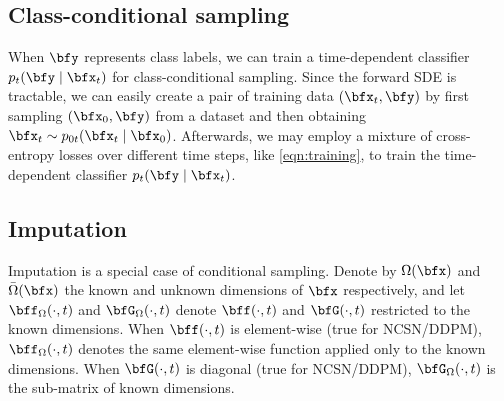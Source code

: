 \subsection{Class-conditional sampling}
When $\bfy$ represents class labels, we can train a time-dependent classifier $p_t(\bfy \mid \bfx_t)$ for class-conditional sampling. Since the forward SDE is tractable, we can easily create a pair of training data $(\bfx_t, \bfy)$ by first sampling $(\bfx_0, \bfy)$ from a dataset and then obtaining $\bfx_t \sim p_{0t}(\bfx_t \mid \bfx_0)$. Afterwards, we may employ a mixture of cross-entropy losses over different time steps, like \cref{eqn:training}, to train the time-dependent classifier $p_t(\bfy \mid \bfx_t)$.


\subsection{Imputation} 
Imputation is a special case of conditional sampling. Denote by $\Omega(\bfx)$ and $\bar{\Omega}(\bfx)$ the known and unknown dimensions of $\bfx$ respectively, and let $\bff_\Omega(\cdot, t)$ and $\bfG_\Omega(\cdot, t)$ denote $\bff(\cdot, t)$ and $\bfG(\cdot, t)$ restricted to the known dimensions. When $\bff(\cdot, t)$ is element-wise (true for NCSN/DDPM), $\bff_\Omega(\cdot, t)$ denotes the same element-wise function applied only to the known dimensions. When $\bfG(\cdot, t)$ is diagonal (true for NCSN/DDPM), $\bfG_\Omega(\cdot, t)$ is the sub-matrix of known dimensions. 

